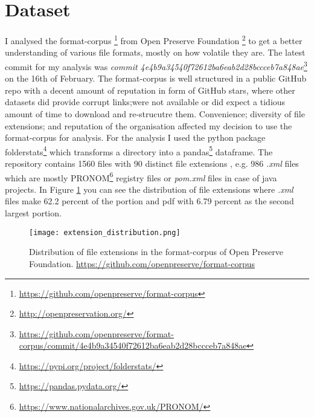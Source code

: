 \section{Dataset}
I analysed the format-corpus \footnote{\url{https://github.com/openpreserve/format-corpus}} from Open Preserve Foundation \footnote{\url{ http://openpreservation.org/}} to get a better understanding of various file formats, mostly on how volatile they are. The latest commit for my analysis was \textit{commit 4e4b9a34540f72612ba6eab2d28bccceb7a848ae}\footnote{\url{https://github.com/openpreserve/format-corpus/commit/4e4b9a34540f72612ba6eab2d28bccceb7a848ae}} on the 16th of February. The format-corpus is well structured in a public GitHub repo with a decent amount of reputation in form of GitHub stars, where other datasets did provide corrupt links;were not available or did expect a tidious amount of time to download and re-strucutre them. Convenience; diversity of file extensions; and reputation of the organisation affected my decision to use the format-corpus for analysis.
For the analysis I used the python package folderstats\footnote{\url{https://pypi.org/project/folderstats/}} which transforms a directory into a pandas\footnote{\url{https://pandas.pydata.org/}} dataframe. The repository contains 1560 files with 90 distinct file extensions , e.g. 986 \textit{.xml} files which are mostly PRONOM\footnote{\url{https://www.nationalarchives.gov.uk/PRONOM/}} registry files or \textit{pom.xml} files in case of java projects. In Figure \ref{fig:extension_distribution} you can see the distribution of file extensions where \textit{.xml} files make 62.2 percent of the portion and pdf with 6.79 percent as the second largest portion.
\begin{figure}[h]
    \caption{Distribution of file extensions in the format-corpus of Open Preserve Foundation. \url{https://github.com/openpreserve/format-corpus}}
    \label{fig:extension_distribution}
    \centering
    \texttt{[image: extension\_distribution.png]}
\end{figure}

